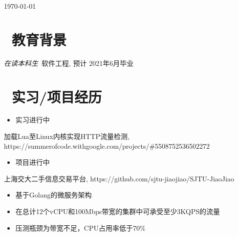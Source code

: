 \documentclass{resume}
\begin{document}
\today



\section{\faGraduationCap\  教育背景}
\textit{在读本科生}\ 软件工程, 预计 2021年6月毕业

\section{\faUsers\ 实习/项目经历}
\role{研发支撑组}{实习生}
\begin{onehalfspacing}
    \begin{itemize}
        \item 实习进行中
    \end{itemize}
\end{onehalfspacing}

\begin{onehalfspacing}
    加载Lua至Linux内核实现HTTP流量检测, https://summerofcode.withgoogle.com/projects/\#5508752536502272
    \begin{itemize}
        \item 项目进行中
    \end{itemize}
\end{onehalfspacing}

\begin{onehalfspacing}
    上海交大二手信息交易平台, https://github.com/sjtu-jiaojiao/SJTU-JiaoJiao
    \begin{itemize}
        \item 基于Golang的微服务架构
        \item 在总计12个vCPU和100Mbps带宽的集群中可承受至少3KQPS的流量
        \item 压测瓶颈为带宽不足，CPU占用率低于70\%
    \end{itemize}
\end{onehalfspacing}
\end{document}
